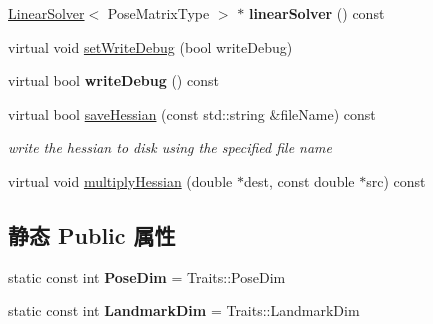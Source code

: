 \begin{DoxyCompactItemize}
\item 
\hypertarget{classg2o_1_1BlockSolver_adb09637f5f87327d26928f672d6caadf}{\hyperlink{classg2o_1_1LinearSolver}{Linear\-Solver}$<$ Pose\-Matrix\-Type $>$ $\ast$ {\bfseries linear\-Solver} () const }\label{classg2o_1_1BlockSolver_adb09637f5f87327d26928f672d6caadf}

\item 
virtual void \hyperlink{classg2o_1_1BlockSolver_a1bff5dc13e3408fa76c019347104acd0}{set\-Write\-Debug} (bool write\-Debug)
\item 
\hypertarget{classg2o_1_1BlockSolver_a5a127b36e9f6ec45b2b1d39c22a9901f}{virtual bool {\bfseries write\-Debug} () const }\label{classg2o_1_1BlockSolver_a5a127b36e9f6ec45b2b1d39c22a9901f}

\item 
\hypertarget{classg2o_1_1BlockSolver_a79adbc8926b11c564bdd8cf73a55b1ef}{virtual bool \hyperlink{classg2o_1_1BlockSolver_a79adbc8926b11c564bdd8cf73a55b1ef}{save\-Hessian} (const std\-::string \&file\-Name) const }\label{classg2o_1_1BlockSolver_a79adbc8926b11c564bdd8cf73a55b1ef}

\begin{DoxyCompactList}\small\item\em write the hessian to disk using the specified file name \end{DoxyCompactList}\item 
virtual void \hyperlink{classg2o_1_1BlockSolver_a615892075357273ec8bb06e101d9155b}{multiply\-Hessian} (double $\ast$dest, const double $\ast$src) const 
\end{DoxyCompactItemize}
\subsection*{静态 Public 属性}
\begin{DoxyCompactItemize}
\item 
\hypertarget{classg2o_1_1BlockSolver_a9a68f557c8e04cd76565fc45e1747e45}{static const int {\bfseries Pose\-Dim} = Traits\-::\-Pose\-Dim}\label{classg2o_1_1BlockSolver_a9a68f557c8e04cd76565fc45e1747e45}

\item 
\hypertarget{classg2o_1_1BlockSolver_a2d5e499f65a71985a8256e98c1608dd9}{static const int {\bfseries Landmark\-Dim} = Traits\-::\-Landmark\-Dim}\label{classg2o_1_1BlockSolver_a2d5e499f65a71985a8256e98c1608dd9}

\end{DoxyCompactItemize}
